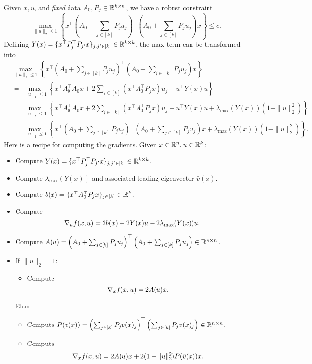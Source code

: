 \documentclass[11pt,oneside]{article}
\theoremstyle{plain}
\theoremstyle{definition}
\theoremstyle{remark}
\begin{document}
Given $x,u$, and \emph{fixed} data $A_0, P_j \in \mathbb{R}^{k \times n}$, we have a robust constraint
\[ \max_{\|u\|_2 \leq 1} \left\{ x^\top \left( A_0 + \sum_{j \in [k]} P_j u_j \right)^\top \left( A_0 + \sum_{j \in [k]} P_j u_j \right) x \right\} \leq c. \]
Defining $Y(x) = \{x^\top P_j^\top P_{j'} x\}_{j,j' \in [k]} \in \mathbb{R}^{k \times k}$, the max term can be transformed into 
\begin{align*}
&\max_{\|u\|_2 \leq 1} \left\{ x^\top \left( A_0 + \sum_{j \in [k]} P_j u_j \right)^\top \left( A_0 + \sum_{j \in [k]} P_j u_j \right) x \right\}\\
&= \max_{\|u\|_2 \leq 1} \left\{ x^\top A_0^\top A_0 x + 2 \sum_{j \in [k]} (x^\top A_0^\top P_j x) u_j + u^\top Y(x) u \right\}\\
&= \max_{\|u\|_2 \leq 1} \left\{ x^\top A_0^\top A_0 x + 2 \sum_{j \in [k]} (x^\top A_0^\top P_j x) u_j + u^\top Y(x) u + \lambda_{\max}(Y(x))(1 - \|u\|_2^2) \right\}\\
&= \max_{\|u\|_2 \leq 1} \left\{ x^\top \left( A_0 + \sum_{j \in [k]} P_j u_j \right)^\top \left( A_0 + \sum_{j \in [k]} P_j u_j \right) x + \lambda_{\max}(Y(x))(1 - \|u\|_2^2) \right\}.
\end{align*}
Here is a recipe for computing the gradients. Given $x \in \mathbb{R}^n, u \in \mathbb{R}^k$:
\begin{itemize}
\item Compute $Y(x) = \{x^\top P_j^\top P_{j'} x\}_{j,j' \in [k]} \in \mathbb{R}^{k \times k}$.
\item Compute $\lambda_{\max}(Y(x))$ and associated leading eigenvector $\bar{v}(x)$.
\item Compute $b(x) = \{x^\top A_0^\top P_j x\}_{j \in [k]} \in \mathbb{R}^k$.
\item Compute
\[ \nabla_u f(x,u) = 2 b(x) + 2 Y(x) u - 2 \lambda_{\max}(Y(x)) u. \]
\item Compute $A(u) = \left( A_0 + \sum_{j \in [k]} P_j u_j \right)^\top \left( A_0 + \sum_{j \in [k]} P_j u_j \right) \in \mathbb{R}^{n \times n}$.
\item If $\|u\|_2 = 1$:
\begin{itemize}
\item Compute
\[ \nabla_x f(x,u) = 2 A(u) x. \]
\end{itemize}
Else:
\begin{itemize}
\item Compute $P(\bar{v}(x)) = \left( \sum_{j \in [k]} P_j \bar{v}(x)_j \right)^\top \left( \sum_{j \in [k]} P_j \bar{v}(x)_j \right) \in \mathbb{R}^{n \times n}$.
\item Compute
\[ \nabla_x f(x,u) = 2 A(u) x + 2(1-\|u\|_2^2) P(\bar{v}(x)) x. \]
\end{itemize}
\end{itemize}




%
%
\end{document}
